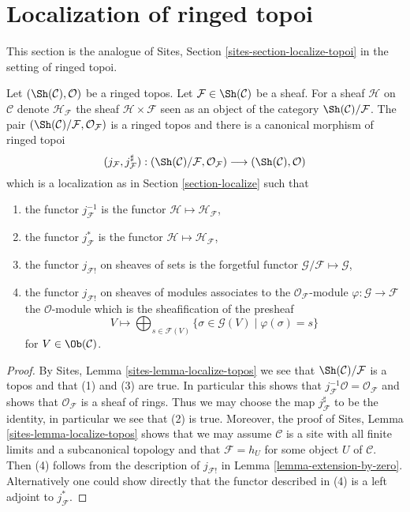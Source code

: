 \section{Localization of ringed topoi}
\label{section-localize-ringed-topoi}

\noindent
This section is the analogue of
Sites, Section \ref{sites-section-localize-topoi}
in the setting of ringed topoi.

\begin{lemma}
\label{lemma-localize-ringed-topos}
Let $(\Sh(\mathcal{C}), \mathcal{O})$ be a ringed topos.
Let $\mathcal{F} \in \Sh(\mathcal{C})$ be a sheaf.
For a sheaf $\mathcal{H}$ on $\mathcal{C}$ denote
$\mathcal{H}_\mathcal{F}$ the sheaf $\mathcal{H} \times \mathcal{F}$
seen as an object of the category $\Sh(\mathcal{C})/\mathcal{F}$.
The pair
$(\Sh(\mathcal{C})/\mathcal{F}, \mathcal{O}_\mathcal{F})$
is a ringed topos and there is a canonical morphism of ringed topoi
$$
(j_\mathcal{F}, j_\mathcal{F}^\sharp) :
(\Sh(\mathcal{C})/\mathcal{F}, \mathcal{O}_\mathcal{F})
\longrightarrow
(\Sh(\mathcal{C}), \mathcal{O})
$$
which is a localization as in
Section \ref{section-localize}
such that
\begin{enumerate}
\item the functor $j_\mathcal{F}^{-1}$ is the functor
$\mathcal{H} \mapsto \mathcal{H}_\mathcal{F}$,
\item the functor $j_\mathcal{F}^*$ is the functor
$\mathcal{H} \mapsto \mathcal{H}_\mathcal{F}$,
\item the functor $j_{\mathcal{F}!}$ on sheaves of sets is the forgetful
functor $\mathcal{G}/\mathcal{F} \mapsto \mathcal{G}$,
\item the functor $j_{\mathcal{F}!}$ on sheaves of modules associates
to the $\mathcal{O}_\mathcal{F}$-module
$\varphi : \mathcal{G} \to \mathcal{F}$ the $\mathcal{O}$-module
which is the sheafification of the presheaf
$$
V \longmapsto
\bigoplus\nolimits_{s \in \mathcal{F}(V)}
\{\sigma \in \mathcal{G}(V) \mid \varphi(\sigma) = s \}
$$
for $V \in \Ob(\mathcal{C})$.
\end{enumerate}
\end{lemma}

\begin{proof}
By
Sites, Lemma \ref{sites-lemma-localize-topos}
we see that $\Sh(\mathcal{C})/\mathcal{F}$ is a topos
and that (1) and (3) are true. In particular this shows that
$j_\mathcal{F}^{-1}\mathcal{O} = \mathcal{O}_\mathcal{F}$
and shows that $\mathcal{O}_\mathcal{F}$ is a sheaf of rings.
Thus we may choose the map $j_\mathcal{F}^\sharp$ to be the identity,
in particular we see that (2) is true.
Moreover, the proof of
Sites, Lemma \ref{sites-lemma-localize-topos}
shows that we may assume $\mathcal{C}$ is a site with all finite limits
and a subcanonical topology and that $\mathcal{F} = h_U$ for some object
$U$ of $\mathcal{C}$.
Then (4) follows from the description of $j_{\mathcal{F}!}$ in
Lemma \ref{lemma-extension-by-zero}.
Alternatively one could show directly that the functor described
in (4) is a left adjoint to $j_\mathcal{F}^*$.
\end{proof}

